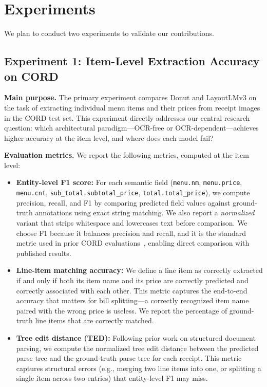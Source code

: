 \documentclass[9pt,twocolumn,twoside]{extarticle}
\begin{document}
\section{Experiments}
\label{sec:experiments}

We plan to conduct two experiments to validate our contributions.

\subsection{Experiment 1: Item-Level Extraction Accuracy on CORD}
\label{sec:exp1}

\noindent\textbf{Main purpose.}
The primary experiment compares Donut and LayoutLMv3 on the task of extracting individual menu items and their prices from receipt images in the CORD test set. This experiment directly addresses our central research question: which architectural paradigm---OCR-free or OCR-dependent---achieves higher accuracy at the item level, and where does each model fail?

\smallskip\noindent\textbf{Evaluation metrics.}
We report the following metrics, computed at the item level:

\begin{itemize}
    \item \textbf{Entity-level F1 score:} For each semantic field (\texttt{menu.nm}, \texttt{menu.price}, \texttt{menu.cnt}, \texttt{sub\_total.subtotal\_price}, \texttt{total.total\_price}), we compute precision, recall, and F1 by comparing predicted field values against ground-truth annotations using exact string matching. We also report a \emph{normalized} variant that strips whitespace and lowercases text before comparison. We choose F1 because it balances precision and recall, and it is the standard metric used in prior CORD evaluations~\cite{park2019cord, kim2022donut, huang2022layoutlmv3}, enabling direct comparison with published results.

    \item \textbf{Line-item matching accuracy:} We define a line item as correctly extracted if and only if both its item name and its price are correctly predicted and correctly associated with each other. This metric captures the end-to-end accuracy that matters for bill splitting---a correctly recognized item name paired with the wrong price is useless. We report the percentage of ground-truth line items that are correctly matched.

    \item \textbf{Tree edit distance (TED):} Following prior work on structured document parsing, we compute the normalized tree edit distance between the predicted parse tree and the ground-truth parse tree for each receipt. This metric captures structural errors (e.g., merging two line items into one, or splitting a single item across two entries) that entity-level F1 may miss.
\end{itemize}
\end{document}
